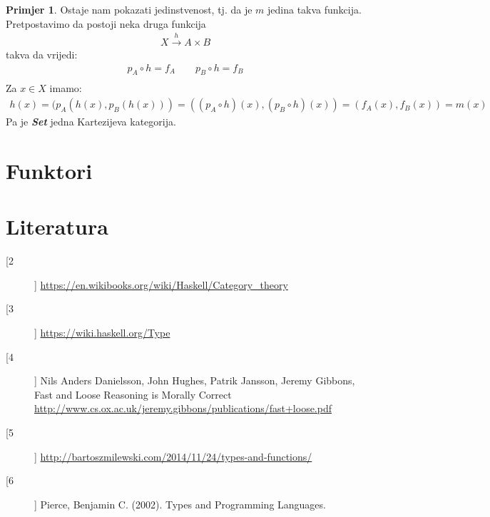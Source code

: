\documentclass[11pt]{article}
\newcommand{\category}[1]{\textbf{\emph{#1}}}
\theoremstyle{definition}
\newtheorem{primjer}{Primjer}
\begin{document}
\begin{primjer}
  Ostaje nam pokazati jedinstvenost, tj. da je $m$ jedina takva funkcija.
  Pretpostavimo da postoji neka druga funkcija
  \begin{align*}
    X \xrightarrow{h} A \times B
  \end{align*}
  takva da  vrijedi:
  \begin{align*}
    p_A \circ h = f_A \qquad p_B \circ h = f_B\\
  \end{align*}
  Za $x \in X$ imamo:
  \begin{align*}
    h(x) = (p_A(h(x), p_B(h(x))) = ((p_A \circ h )(x), (p_B \circ h)(x)) =
    (f_A(x), f_B(x)) = m(x)
  \end{align*}
  Pa je \category{Set} jedna Kartezijeva kategorija.
  \end{primjer}
  \newpage
  \section{Funktori}

  \newpage
  \section*{Literatura}
  \begin{description}
    \item[[2]]
      \url {https://en.wikibooks.org/wiki/Haskell/Category\_theory}
    \item[[3]]
      \url {https://wiki.haskell.org/Type}

    \item[[4]] \label{bib:fast-loose}
      Nils Anders Danielsson, John Hughes, Patrik Jansson, Jeremy Gibbons,
Fast and Loose Reasoning is Morally Correct
\url{http://www.cs.ox.ac.uk/jeremy.gibbons/publications/fast+loose.pdf}
  \item[[5]]
    \url{http://bartoszmilewski.com/2014/11/24/types-and-functions/}
  \item[[6]]
    Pierce, Benjamin C. (2002). Types and Programming Languages.
  \end{description}
\end{document}
